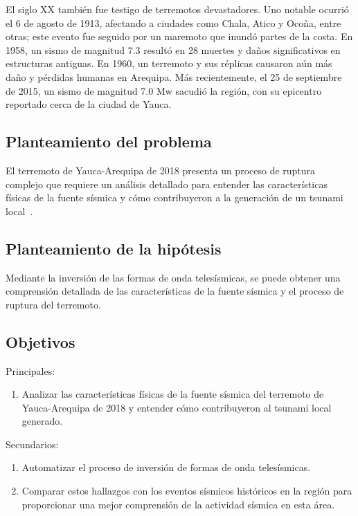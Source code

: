 \documentclass[a4paper,11pt]{article}
\begin{document}
El siglo XX también fue testigo de terremotos devastadores. Uno notable ocurrió el 6 de agosto de 1913, afectando a ciudades como Chala, Atico y Ocoña, entre otras; este evento fue seguido por un maremoto que inundó partes de la costa. En 1958, un sismo de magnitud 7.3 resultó en 28 muertes y daños significativos en estructuras antiguas. En 1960, un terremoto y sus réplicas causaron aún más daño y pérdidas humanas en Arequipa. Más recientemente, el 25 de septiembre de 2015, un sismo de magnitud 7.0 Mw sacudió la región, con su epicentro reportado cerca de la ciudad de Yauca.

\subsection*{Planteamiento del problema}

El terremoto de Yauca-Arequipa de 2018 presenta un proceso de ruptura complejo que requiere un análisis detallado para entender las características físicas de la fuente sísmica y cómo contribuyeron a la generación de un tsunami local~\cite{CEN13}.

\subsection*{Planteamiento de la hipótesis}

Mediante la inversión de las formas de onda telesísmicas, se puede obtener una comprensión detallada de las características de la fuente sísmica y el proceso de ruptura del terremoto.

\subsection*{Objetivos}

Principales:

\begin{enumerate}
  \item Analizar las características físicas de la fuente sísmica del terremoto de Yauca-Arequipa de 2018 y entender cómo contribuyeron al tsunami local generado.
\end{enumerate}

Secundarios:

\begin{enumerate}
  \item Automatizar el proceso de inversión de formas de onda telesísmicas.
  \item Comparar estos hallazgos con los eventos sísmicos históricos en la región para proporcionar una mejor comprensión de la actividad sísmica en esta área.
\end{enumerate}
\end{document}
